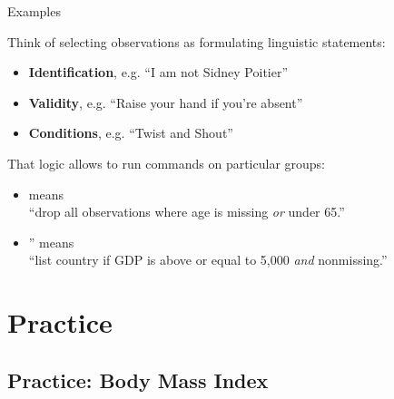 \documentclass{beamer}
\begin{document}
	\begin{frame}[t]{Examples}
	
	Think of selecting observations as formulating linguistic statements:

	\begin{itemize}
		\item \textbf{Identification}, e.g. ``I am not Sidney Poitier''\\
		
		\item \textbf{Validity}, e.g. ``Raise your hand if you're absent''\\
		
		\item \textbf{Conditions}, e.g. ``Twist and Shout''\\
	\end{itemize}
	
	That logic allows to run commands on particular groups:
	
	\begin{itemize}
		\item {} means\\``drop all observations where age is missing \textit{or} under 65.''
		\item {}'' means\\``list country if GDP is above or equal to 5,000 \textit{and} nonmissing.''
	\end{itemize}
	\end{frame}
	
	\section{Practice}
		
	\subsection{Practice: Body Mass Index}
	
\end{document}
